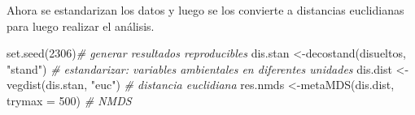 \documentclass[
]{book}
\newenvironment{Shaded}{\begin{snugshade}}{\end{snugshade}}
\newcommand{\AttributeTok}[1]{\textcolor[rgb]{0.77,0.63,0.00}{#1}}
\newcommand{\CommentTok}[1]{\textcolor[rgb]{0.56,0.35,0.01}{\textit{#1}}}
\newcommand{\DecValTok}[1]{\textcolor[rgb]{0.00,0.00,0.81}{#1}}
\newcommand{\FunctionTok}[1]{\textcolor[rgb]{0.00,0.00,0.00}{#1}}
\newcommand{\NormalTok}[1]{#1}
\newcommand{\OtherTok}[1]{\textcolor[rgb]{0.56,0.35,0.01}{#1}}
\newcommand{\StringTok}[1]{\textcolor[rgb]{0.31,0.60,0.02}{#1}}
\begin{document}
Ahora se estandarizan los datos y luego se los convierte a distancias euclidianas para luego realizar el análisis.

\begin{Shaded}
\begin{Highlighting}[]
\FunctionTok{set.seed}\NormalTok{(}\DecValTok{2306}\NormalTok{)}\CommentTok{\# generar resultados reproducibles}
\NormalTok{dis.stan }\OtherTok{\textless{}{-}}\FunctionTok{decostand}\NormalTok{(disueltos, }\StringTok{"stand"}\NormalTok{) }\CommentTok{\# estandarizar: variables ambientales en diferentes unidades}
\NormalTok{dis.dist }\OtherTok{\textless{}{-}}\FunctionTok{vegdist}\NormalTok{(dis.stan, }\StringTok{"euc"}\NormalTok{) }\CommentTok{\# distancia euclidiana}
\NormalTok{res.nmds }\OtherTok{\textless{}{-}}\FunctionTok{metaMDS}\NormalTok{(dis.dist,  }\AttributeTok{trymax =} \DecValTok{500}\NormalTok{) }\CommentTok{\# NMDS}
\end{Highlighting}
\end{Shaded}
\end{document}
